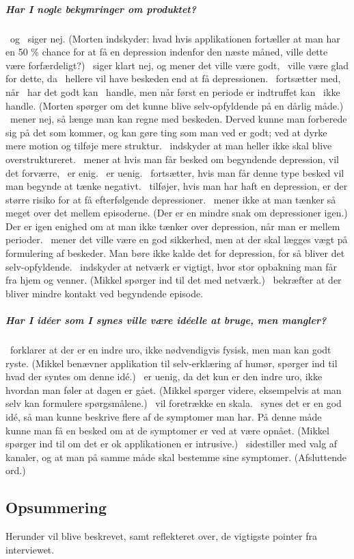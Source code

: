 \subparagraph{Har I nogle bekymringer om produktet?}
\pa~og \pe~siger nej.
(Morten indskyder: hvad hvis applikationen fortæller at man har en 50 \% chance for at få en depression indenfor den næste måned, ville dette være forfærdeligt?)
\pa~siger klart nej, og mener det ville være godt, \pa~ville være glad for dette, da \pa~hellere vil have beskeden end at få depressionen.
\pa~fortsætter med, når \pa~har det godt kan \pa~handle, men når først en periode er indtruffet kan \pa~ikke handle.
(Morten spørger om det kunne blive selv-opfyldende på en dårlig måde.)
\pe~mener nej, så længe man kan regne med beskeden.
Derved kunne man forberede sig på det som kommer, og kan gøre ting som man ved er godt; ved at dyrke mere motion og tilføje mere struktur.
\pa~indskyder at man heller ikke skal blive overstruktureret.
\pe~mener at hvis man får besked om begyndende depression, vil det forværre, \pd~er enig.
\pa~er uenig.
\pd~fortsætter, hvis man får denne type besked vil man begynde at tænke negativt.
\pe~tilføjer, hvis man har haft en depression, er der større risiko for at få efterfølgende depressioner.
\pe~mener ikke at man tænker så meget over det mellem episoderne.
(Der er en mindre snak om depressioner igen.)
Der er igen enighed om at man ikke tænker over depression, når man er mellem perioder.
\pa~mener det ville være en god sikkerhed, men at der skal lægges vægt på formulering af beskeder.
Man børe ikke kalde det for depression, for så bliver det selv-opfyldende.
\pd~indskyder at netværk er vigtigt, hvor stor opbakning man får fra hjem og venner.
(Mikkel spørger ind til det med netværk.)
\pd~bekræfter at der bliver mindre kontakt ved begyndende episode.

\subparagraph{Har I idéer som I synes ville være idéelle at bruge, men mangler?}
\pa~forklarer at der er en indre uro, ikke nødvendigvis fysisk, men man kan godt ryste.
(Mikkel benævner applikation til selv-erklæring af humør, spørger ind til hvad der syntes om denne idé.)
\pa~er uenig, da det kun er den indre uro, ikke hvordan man føler at dagen er gået.
(Mikkel spørger videre, eksempelvis at man selv kan formulere spørgsmålene.)
\pa~vil foretrække en skala.
\pa~synes det er en god idé, så man kunne beskrive flere af de symptomer man har.
På denne måde kunne man få en besked om at de symptomer er ved at være opnået.
(Mikkel spørger ind til om det er ok applikationen er intrusive.)
\pa~sidestiller med valg af kanaler, og at man på samme måde skal bestemme sine symptomer.
(Afsluttende ord.)

\subsection{Opsummering}
Herunder vil blive beskrevet, samt reflekteret over, de vigtigste pointer fra interviewet.

